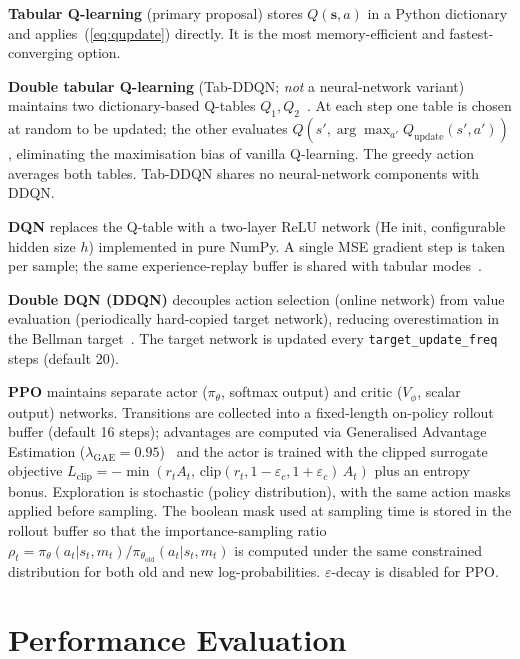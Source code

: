 \documentclass[conference]{IEEEtran}
\begin{document}
\textbf{Tabular Q-learning} (primary proposal) stores $Q(\mathbf{s},a)$
in a Python dictionary and applies~(\ref{eq:qupdate}) directly.
It is the most memory-efficient and fastest-converging option.

\textbf{Double tabular Q-learning} (Tab-DDQN; \emph{not} a neural-network
variant) maintains two dictionary-based Q-tables $Q_1, Q_2$~\cite{hasselt2010}.
At each step one table is chosen at random to be updated; the other evaluates
$Q(s',\arg\max_{a'}Q_\text{update}(s',a'))$, eliminating the maximisation
bias of vanilla Q-learning.
The greedy action averages both tables.
Tab-DDQN shares no neural-network components with DDQN.

\textbf{DQN} replaces the Q-table with a two-layer ReLU network
(He init, configurable hidden size $h$) implemented in pure NumPy.
A single MSE gradient step is taken per sample; the same experience-replay
buffer is shared with tabular modes~\cite{mnih2015}.

\textbf{Double DQN (DDQN)} decouples action selection (online network)
from value evaluation (periodically hard-copied target network), reducing
overestimation in the Bellman target~\cite{vanhasselt2016}.
The target network is updated every \texttt{target\_update\_freq} steps
(default 20).

\textbf{PPO} maintains separate actor ($\pi_\theta$, softmax output) and
critic ($V_\phi$, scalar output) networks.
Transitions are collected into a fixed-length on-policy rollout buffer
(default 16 steps); advantages are computed via Generalised Advantage
Estimation ($\lambda_\text{GAE}=0.95$)~\cite{schulman2015} and the
actor is trained with the clipped surrogate objective
$L_\text{clip}=-\min\!\left(r_t A_t,\,
\text{clip}(r_t,1\!-\!\varepsilon_c,1\!+\!\varepsilon_c)\,A_t\right)$
plus an entropy bonus.
Exploration is stochastic (policy distribution), with the same action
masks applied before sampling.
The boolean mask used at sampling time is stored in the rollout buffer
so that the importance-sampling ratio
$\rho_t = \pi_\theta(a_t|s_t,m_t)/\pi_{\theta_\text{old}}(a_t|s_t,m_t)$
is computed under the same constrained distribution for both old and new
log-probabilities.
$\varepsilon$-decay is disabled for PPO.

\section{Performance Evaluation}
\end{document}
